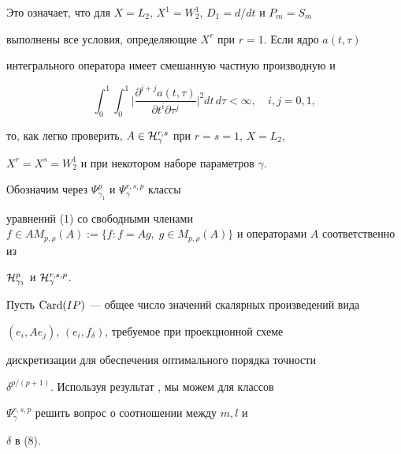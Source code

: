 Это означает, что для $X=L_2$, $X^1=W_2^1$, $D_1=d/dt$ и $P_m=S_m$


выполнены все условия, определяющие $X^r$ при $r=1$. Если ядро $a(t,\tau)$


интегрального оператора имеет смешанную частную производную и


$$


\int_0^1 \int_0^1 \biggl|\frac{\partial^{i+j}a(t,\tau)}


{\partial t^i \partial\tau^j}\biggr|^2 dt\,d\tau < \infty , \quad


i,j=0,1,


$$


то, как легко проверить, $A\in{\cal H}_\gamma^{r,s}$ при $r=s=1$, $X=L_2$,


$X^r=X^s=W_2^1$ и при некотором наборе параметров $\gamma$.





Обозначим через $\Psi_{\gamma_1}^p$ и $\Psi_\gamma^{r,s,p}$ классы


уравнений (1) со свободными членами $f\in AM_{p,\rho}(A):= \{f: f=Ag,


\; g\in M_{p,\rho}(A)\}$ и операторами $A$ соответственно из


${\cal H}_{\gamma_1}^p$ и ${\cal H}_\gamma^{r,s,p}$.





Пусть $\operatorname{Card}(IP)$ --- общее число значений скалярных произведений вида


$(e_i,Ae_j)$, $(e_i,f_\delta)$, требуемое при проекционной схеме


дискретизации для обеспечения оптимального порядка точности


$\delta^{p/(p+1)}$. Используя результат \cite{PV}, мы можем для классов


$\Psi_\gamma^{r,s,p}$ решить вопрос о соотношении между $m, l$ и


$\delta$ в (8).






